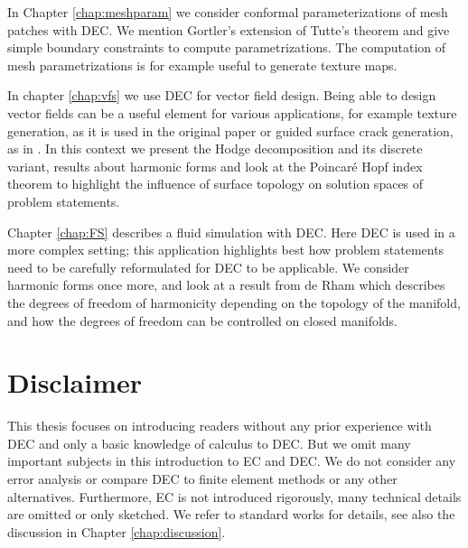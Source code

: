 In Chapter \ref{chap:meshparam} we consider conformal parameterizations of mesh patches with DEC. We mention Gortler's extension of Tutte's theorem and give simple boundary constraints to compute parametrizations. The computation of mesh parametrizations is for example useful to generate texture maps. 

In chapter \ref{chap:vfs} we use  DEC for vector field design. Being able to design vector fields can be a useful element for various applications, for example texture generation, as it is used in the original paper \cite{vField} or guided surface crack generation, as in \cite{kirtap}. In this context we present the Hodge decomposition and its discrete variant, results about harmonic forms and look at the Poincar\'e Hopf index theorem to highlight the influence of surface topology on solution spaces of problem statements.

Chapter \ref{chap:FS} describes a fluid simulation with DEC. Here DEC is used in a more complex setting; this application highlights best how problem statements need to be carefully reformulated for DEC to be applicable. We consider harmonic forms once more, and look at a result from de Rham which describes the degrees of freedom of harmonicity depending on the topology of the manifold, and how the degrees of freedom can be controlled on closed manifolds. 

\section{Disclaimer}
This thesis focuses on introducing readers without any prior experience with DEC and only a basic knowledge of calculus to DEC. But we omit many important subjects in this introduction to EC and DEC.  We do not consider any error analysis or compare DEC to finite element methods or any other alternatives. Furthermore, EC is not introduced rigorously, many technical details are omitted or only sketched. We refer to standard works for details, see also the discussion in Chapter \ref{chap:discussion}.
	